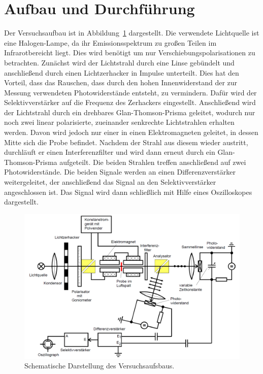 \section{Aufbau und Durchführung}
Der Versuchsaufbau ist in Abbildung~\ref{fig:aufbau} dargestellt. Die verwendete Lichtquelle ist eine Halogen-Lampe, da ihr Emissionsspektrum
zu großen Teilen im Infrarotbereicht liegt. Dies wird benötigt um nur Verschiebungspolarisationen zu betrachten. Zunächst wird der Lichtstrahl durch
eine Linse gebündelt und anschließend durch einen Lichtzerhacker in Impulse unterteilt. Dies hat den Vorteil, dass das Rauschen, dass durch den hohen
Innenwiderstand der zur Messung verwendeten Photowiderstände entsteht, zu vermindern. Dafür wird der Selektivverstärker auf die Frequenz des Zerhackers eingestellt.
Anschließend wird der Lichtstrahl durch ein drehbares Glan-Thomson-Prisma geleitet, wodurch nur noch zwei linear polarisierte, zueinander senkrechte Lichtstrahlen
erhalten werden. Davon wird jedoch nur einer in einen Elektromagneten geleitet, in dessen Mitte sich die Probe befindet. Nachdem der Strahl aus
diesem wieder austritt, durchläuft er einen Interferenzfilter und wird dann erneut durch ein Glan-Thomson-Prisma aufgeteilt. Die beiden Strahlen treffen
anschließend auf zwei Photowiderstände. Die beiden Signale werden an einen Differenzverstärker weitergeleitet, der anschließend das Signal an den Selektivverstärker
angeschlossen ist. Das Signal wird dann schließlich mit Hilfe eines Oszilloskopes dargestellt.\\

\begin{figure}
  \centering
  \includegraphics[scale=0.35]{graphics/aufbau.png}
  \caption{Schematische Darstellung des Versuchsaufsbaus.}
  \label{fig:aufbau}
\end{figure}

